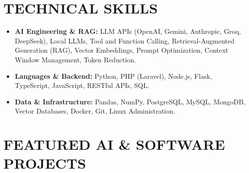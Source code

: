 \documentclass[a4paper,10pt]{article}
\begin{document}
\section{TECHNICAL SKILLS}
\begin{itemize}
    \item \textbf{AI Engineering \& RAG:} LLM APIs (OpenAI, Gemini, Anthropic, Groq, DeepSeek), Local LLMs, Tool and Function Calling, Retrieval-Augmented Generation (RAG), Vector Embeddings, Prompt Optimization, Context Window Management, Token Reduction.
    \item \textbf{Languages \& Backend:} Python, PHP (Laravel), Node.js, Flask, TypeScript, JavaScript, RESTful APIs, SQL.
    \item \textbf{Data \& Infrastructure:} Pandas, NumPy, PostgreSQL, MySQL, MongoDB, Vector Databases, Docker, Git, Linux Administration.
\end{itemize}

\section{FEATURED AI \& SOFTWARE PROJECTS}
\end{document}
